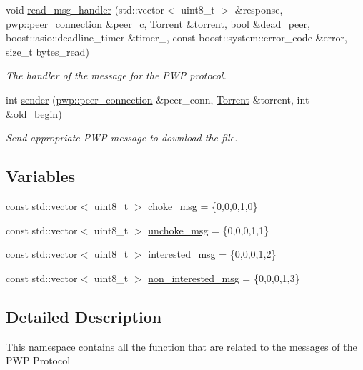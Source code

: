 \begin{DoxyCompactItemize}
\item 
void \hyperlink{namespacepwp__msg_aec35de04a2f2d9cb6abdd777917cfaae}{read\+\_\+msg\+\_\+handler} (std\+::vector$<$ uint8\+\_\+t $>$ \&response, \hyperlink{structpwp_1_1peer__connection}{pwp\+::peer\+\_\+connection} \&peer\+\_\+c, \hyperlink{structtorr_1_1Torrent}{Torrent} \&torrent, bool \&dead\+\_\+peer, boost\+::asio\+::deadline\+\_\+timer \&timer\+\_\+, const boost\+::system\+::error\+\_\+code \&error, size\+\_\+t bytes\+\_\+read)
\begin{DoxyCompactList}\small\item\em The handler of the message for the P\+WP protocol. \end{DoxyCompactList}\item 
int \hyperlink{namespacepwp__msg_ab578b213d293636d33efc24382f16b25}{sender} (\hyperlink{structpwp_1_1peer__connection}{pwp\+::peer\+\_\+connection} \&peer\+\_\+conn, \hyperlink{structtorr_1_1Torrent}{Torrent} \&torrent, int \&old\+\_\+begin)
\begin{DoxyCompactList}\small\item\em Send appropriate P\+WP message to download the file. \end{DoxyCompactList}\end{DoxyCompactItemize}
\subsection*{Variables}
\begin{DoxyCompactItemize}
\item 
const std\+::vector$<$ uint8\+\_\+t $>$ \hyperlink{namespacepwp__msg_a695ee2efb59a7c258559f19440fe6998}{choke\+\_\+msg} = \{0,0,0,1,0\}
\item 
const std\+::vector$<$ uint8\+\_\+t $>$ \hyperlink{namespacepwp__msg_acdc5eb698534e84a15db0e061c511e7c}{unchoke\+\_\+msg} = \{0,0,0,1,1\}
\item 
const std\+::vector$<$ uint8\+\_\+t $>$ \hyperlink{namespacepwp__msg_afc68b17ce131c52fa0beb0cc7185778b}{interested\+\_\+msg} = \{0,0,0,1,2\}
\item 
const std\+::vector$<$ uint8\+\_\+t $>$ \hyperlink{namespacepwp__msg_a16a5f22f784d872342a82af9f6b77830}{non\+\_\+interested\+\_\+msg} = \{0,0,0,1,3\}
\end{DoxyCompactItemize}


\subsection{Detailed Description}
This namespace contains all the function that are related to the messages of the P\+WP Protocol 


